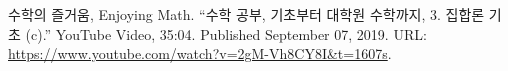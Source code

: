 \documentclass[11pt,openany]{article}
\begin{document}

\begin{thebibliography}{9}
	수학의 즐거움, Enjoying Math. ``수학 공부, 기초부터 대학원 수학까지, 3. 집합론 기초 (c).'' YouTube Video, 35:04. Published 
	September 07, 2019. URL: \url{https://www.youtube.com/watch?v=2gM-Vh8CY8I&t=1607s}.
\end{thebibliography}
\end{document}
